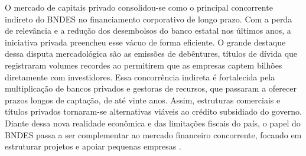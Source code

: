O mercado de capitais privado consolidou-se como o principal concorrente indireto do BNDES no financiamento corporativo de longo prazo. Com a perda de relevância e a redução dos desembolsos do banco estatal nos últimos anos, a iniciativa privada preencheu esse vácuo de forma eficiente. O grande destaque dessa disputa mercadológica são as emissões de debêntures, títulos de dívida que registraram volumes recordes ao permitirem que as empresas captem bilhões diretamente com investidores. Essa concorrência indireta é fortalecida pela multiplicação de bancos privados e gestoras de recursos, que passaram a oferecer prazos longos de captação, de até vinte anos. Assim, estruturas comerciais e títulos privados tornaram-se alternativas viáveis ao crédito subsidiado do governo. Diante dessa nova realidade econômica e das limitações fiscais do país, o papel do BNDES passa a ser complementar ao mercado financeiro concorrente, focando em estruturar projetos e apoiar pequenas empresas \cite{purchio2022capital}.